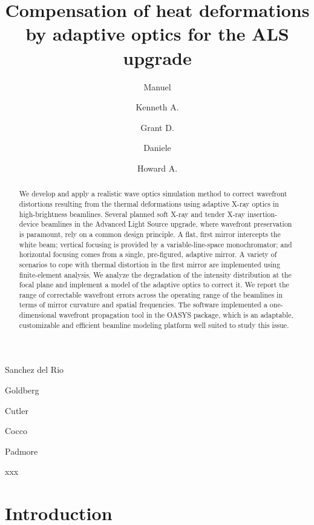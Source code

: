 \documentclass{iucr}              %
\begin{document}

\title{Compensation of heat deformations by adaptive optics for the ALS upgrade}

\author[a]{Manuel}{Sanchez del Rio}
\author[a]{Kenneth A.}{Goldberg}
\author[a]{Grant D.}{Cutler}
\author[a]{Daniele}{Cocco}
\author[a]{Howard A.}{Padmore}

 
\maketitle

\begin{synopsis}
xxx 
\end{synopsis}

\begin{abstract}
We develop and apply a realistic wave optics simulation method to correct wavefront distortions resulting from the thermal deformations using adaptive X-ray optics in high-brightness beamlines. Several planned soft X-ray and tender X-ray insertion-device beamlines in the Advanced Light Source upgrade, where wavefront preservation is paramount, rely on a common design principle. A flat, first mirror intercepts the white beam; vertical focusing is provided by a variable-line-space monochromator; and horizontal focusing comes from a single, pre-figured, adaptive mirror. 
A variety of scenarios to cope with thermal distortion in the first mirror are implemented using finite-element analysis. We analyze the degradation of the intensity distribution at the focal plane and implement a model of the adaptive optics to correct it. We report the range of correctable wavefront errors across the operating range of the beamlines in terms of mirror curvature and spatial frequencies. The software implemented a one-dimensional wavefront propagation tool in the OASYS package, which is an adaptable, customizable and efficient beamline modeling platform well suited to study this issue.
\end{abstract}



\section{Introduction}
\label{sec:intro}  
\end{document}
